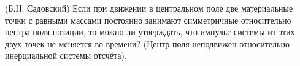 (Б.Н. Садовский)
Если при движении в центральном поле две материальные точки с равными
массами постоянно занимают симметричные относительно центра поля
позиции, то можно ли утверждать, что импульс системы из этих двух точек
не меняется во времени? (Центр поля неподвижен относительно инерциальной
системы отсчёта).
